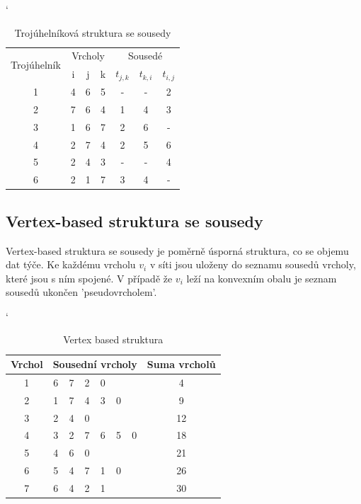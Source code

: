 \documentclass[12pt,a4paper]{article}
\begin{document}
\begin{table}[h]
\catcode`
\begin{tabular}{|c||c|c|c||c|c|c|}
\hline
\multirow{2}{*}{Trojúhelník} & \multicolumn{3}{|c|}{Vrcholy} & \multicolumn{3}{|c|}{Sousedé}      \\ \cline{2-7} 
                             & i        & j       & k       & $t_{j,k}$ & $t_{k,i}$ & $t_{i,j}$ \\ \hline \hline
1                            & 4        & 6       & 5       & -         & -         & 2         \\ \hline
2                            & 7        & 6       & 4       & 1         & 4         & 3         \\ \hline
3                            & 1        & 6       & 7       & 2         & 6         & -         \\ \hline
4                            & 2        & 7       & 4       & 2         & 5         & 6         \\ \hline
5                            & 2        & 4       & 3       & -         & -         & 4         \\ \hline
6                            & 2        & 1       & 7       & 3         & 4         & -         \\ \hline
\end{tabular}
\caption{Trojúhelníková struktura se sousedy}
\label{tab:troj_strukt_sous}
\end{table}

\subsection{Vertex-based struktura se sousedy}

Vertex-based struktura se sousedy je poměrně úsporná struktura, co se objemu dat týče. Ke každému vrcholu $v_i$ v síti jsou uloženy do seznamu sousedů vrcholy, které jsou s ním spojené. V případě že $v_i$ leží na konvexním obalu je seznam sousedů ukončen 'pseudovrcholem'. 

\begin{table}[h]
\catcode`
\begin{tabular}{|c||c|c|c|c|c|c||c|}
\hline
Vrchol & \multicolumn{6}{|c|}{Sousední vrcholy} & Suma vrcholů \\ \hline \hline
1      & 6    & 7    & 2    & 0    &     &     & 4            \\ \hline
2      & 1    & 7    & 4    & 3    & 0   &     & 9            \\ \hline
3      & 2    & 4    & 0    &      &     &     & 12           \\ \hline
4      & 3    & 2    & 7    & 6    & 5   & 0   & 18           \\ \hline
5      & 4    & 6    & 0    &      &     &     & 21           \\ \hline
6      & 5    & 4    & 7    & 1    & 0   &     & 26           \\ \hline
7      & 6    & 4    & 2    & 1    &     &     & 30           \\ \hline
\end{tabular}
\caption{Vertex based struktura}
\label{tab:vertex_based}
\end{table}
\end{document}
